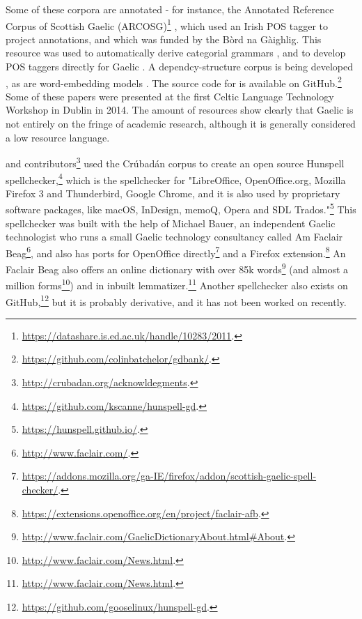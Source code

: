 Some of these corpora are annotated - for instance, the Annotated Reference Corpus of Scottish Gaelic (ARCOSG)\footnote{\href{https://datashare.is.ed.ac.uk/handle/10283/2011}{https://datashare.is.ed.ac.uk/handle/10283/2011}. } \citep{ARCOSG2016, lamb2014scottish}, which used an Irish POS tagger \citep{ui2006part} to project annotations, and which was funded by the B\`ord na G\`aighlig. This resource was used to automatically derive categorial grammars \citep{batchelor2016automatic}, and to develop POS taggers directly for Gaelic \citep{lamb2014developing}. A dependcy-structure corpus is being developed \citep{batchelor2014gdbank}, as are word-embedding models \citep{lamb2016developing}. The source code for \citet{batchelor2014gdbank, batchelor2016automatic} is available on GitHub.\footnote{\href{https://github.com/colinbatchelor/gdbank/}{https://github.com/colinbatchelor/gdbank/}. } Some of these papers were presented at the first Celtic Language Technology Workshop in Dublin in 2014. The amount of resources show clearly that Gaelic is not entirely on the fringe of academic research, although it is generally considered a low resource language.

\citet{scannell2007crubadan} and contributors\footnote{\href{http://crubadan.org/acknowldegments}{http://crubadan.org/acknowldegments}. } used the Cr\'ubad\'an corpus to create an open source Hunspell spellchecker,\footnote{\href{https://github.com/kscanne/hunspell-gd}{https://github.com/kscanne/hunspell-gd}. } which is the spellchecker for "LibreOffice, OpenOffice.org, Mozilla Firefox 3 and Thunderbird, Google Chrome, and it is also used by proprietary software packages, like macOS, InDesign, memoQ, Opera and SDL Trados."\footnote{\href{https://hunspell.github.io/}{https://hunspell.github.io/}. } This spellchecker was built with the help of Michael Bauer, an independent Gaelic technologist who runs a small Gaelic technology consultancy called Am Faclair Beag\footnote{\href{http://www.faclair.com/}{http://www.faclair.com/}. }, and also has ports for OpenOffice directly\footnote{\href{https://addons.mozilla.org/ga-IE/firefox/addon/scottish-gaelic-spell-checker/}{https://addons.mozilla.org/ga-IE/firefox/addon/scottish-gaelic-spell-checker/}. } and a Firefox extension.\footnote{\href{https://extensions.openoffice.org/en/project/faclair-afb}{https://extensions.openoffice.org/en/project/faclair-afb}. } An Faclair Beag also offers an online dictionary with over 85k words\footnote{\href{http://www.faclair.com/GaelicDictionaryAbout.html\#About}{http://www.faclair.com/GaelicDictionaryAbout.html\#About}. }
 (and almost a million forms\footnote{\href{http://www.faclair.com/News.html}{http://www.faclair.com/News.html}. }) and in inbuilt lemmatizer.\footnote{\href{http://www.faclair.com/News.html}{http://www.faclair.com/News.html}. } Another spellchecker also exists on GitHub,\footnote{\href{https://github.com/gooselinux/hunspell-gd}{https://github.com/gooselinux/hunspell-gd}. } but it is probably derivative, and it has not been worked on recently.

